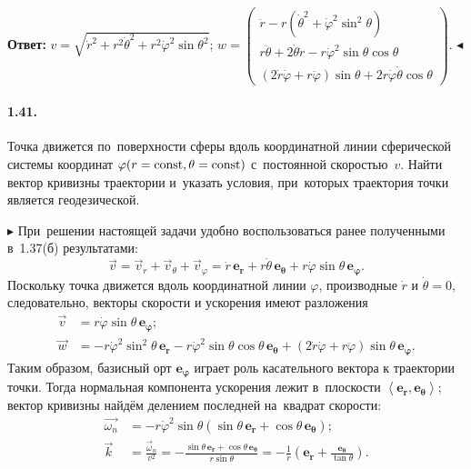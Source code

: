 \documentclass{weekly}
\begin{document}
\textbf{Ответ:}\quad
$v = \sqrt{\dot r^2 + r^2 \dot\theta^2 +
    r^2 \dot\varphi^2 \sin\theta^2}$;\qquad
$w = \begin{pmatrix}
    \ddot r - r \left( \dot\theta^2 +
            \dot\varphi^2 \sin^2\theta \right) \\
    r \ddot\theta + 2\dot\theta \dot r -
            r \dot\varphi^2 \sin\theta \cos\theta \\
    (2 \dot r \dot\varphi + r \ddot\varphi) \sin\theta +
            2r \dot\varphi \dot\theta \cos\theta
\end{pmatrix}$.
\hfill $\blacktriangleleft$

\clearpage

\paragraph{1.41.} Точка движется по~поверхности сферы вдоль
координатной линии сферической системы координат
$\varphi (r=\mathrm{const}, \theta=\mathrm{const})$ с~постоянной скоростью~$v$.
Найти вектор кривизны траектории и~указать условия, при~которых
траектория точки является геодезической.

$\blacktriangleright$ При~решении настоящей задачи удобно
воспользоваться ранее полученными в~1.37(б) результатами:
\begin{equation}
    \vec v = \vec v_r + \vec v_\theta + \vec v_\varphi
        = \dot r\,\mathbf{e_r} + r\dot\theta\,\mathbf{e_\theta} +
            r \dot\varphi \sin\theta\,\mathbf{e_\varphi}.
\end{equation}
Поскольку точка движется вдоль координатной линии $\varphi$,
производные $\dot r$ и $\dot\theta = 0$, следовательно,
векторы скорости и ускорения имеют разложения
\begin{align}
    \vec v &= r \dot\varphi \sin\theta\,\mathbf{e_\varphi}; \\
    \vec w &= - r \dot\varphi^2 \sin^2\theta\,\mathbf{e_r} -
            r \dot\varphi^2 \sin\theta
                \cos\theta\,\mathbf{e_\theta} +
            (2 \dot r \dot\varphi + r \ddot\varphi) \sin\theta
                \,\mathbf{e_\varphi}.
\end{align}
Таким образом, базисный орт $\mathbf{e_\varphi}$ играет роль
касательного вектора к траектории точки. Тогда нормальная
компонента ускорения лежит в~плоскости
$\left<\mathbf{e_r}, \mathbf{e_\theta}\right>$;
вектор кривизны найдём делением последней на~квадрат скорости:
\begin{align}
    \vec{\omega_n} &= -r \dot\varphi^2 \sin\theta
            \left( \sin\theta\,\mathbf{e_r} +
            \cos\theta\,\mathbf{e_\theta} \right); \\
    \vec{k} &= \frac{\vec\omega_n}{v^2}
        = -\frac{\sin\theta\,\mathbf{e_r} +
            \cos\theta\,\mathbf{e_\theta}}{r \sin\theta}
        = -\frac{1}{r} \left( \mathbf{e_r} +
            \frac{\mathbf{e_\theta}}{\tan\theta} \right).
\end{align}
\end{document}
